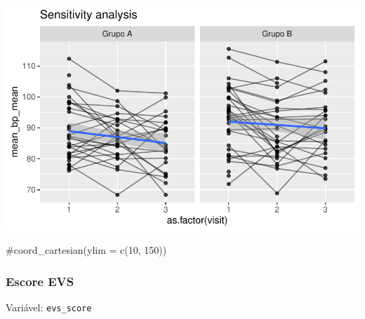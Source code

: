 \documentclass[
  letterpaper,
  DIV=11,
  numbers=noendperiod]{scrartcl}
\newenvironment{Shaded}{\begin{snugshade}}{\end{snugshade}}
\newcommand{\CommentTok}[1]{\textcolor[rgb]{0.37,0.37,0.37}{#1}}
\begin{document}
\includegraphics{Outcomes_V1V2V3_files/figure-pdf/mean_bp_mean_6-2.pdf}

\begin{Shaded}
\begin{Highlighting}[]
    \CommentTok{\#coord\_cartesian(ylim = c(10, 150))}
\end{Highlighting}
\end{Shaded}

\subsubsection{Escore EVS}\label{escore-evs}

Variável: \texttt{evs\_score}
\end{document}

